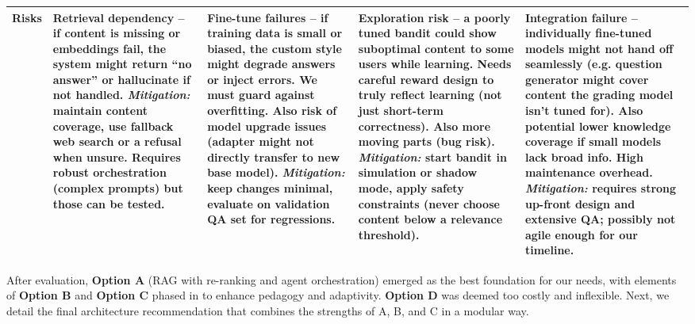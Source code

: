\documentclass[11pt]{article}
\begin{document}
\begin{table}[h!]
\begin{tabular}{p{2.8cm} p{3.4cm} p{3.4cm} p{3.4cm} p{3.4cm}}
\textbf{Risks} & Retrieval dependency – if content is missing or embeddings fail, the system might return “no answer” or hallucinate if not handled. \textit{Mitigation:} maintain content coverage, use fallback web search or a refusal when unsure. Requires robust orchestration (complex prompts) but those can be tested. & Fine-tune failures – if training data is small or biased, the custom style might degrade answers or inject errors. We must guard against overfitting. Also risk of model upgrade issues (adapter might not directly transfer to new base model). \textit{Mitigation:} keep changes minimal, evaluate on validation QA set for regressions. & Exploration risk – a poorly tuned bandit could show suboptimal content to some users while learning. Needs careful reward design to truly reflect learning (not just short-term correctness). Also more moving parts (bug risk). \textit{Mitigation:} start bandit in simulation or shadow mode, apply safety constraints (never choose content below a relevance threshold). & Integration failure – individually fine-tuned models might not hand off seamlessly (e.g. question generator might cover content the grading model isn’t tuned for). Also potential lower knowledge coverage if small models lack broad info. High maintenance overhead. \textit{Mitigation:} requires strong up-front design and extensive QA; possibly not agile enough for our timeline. \\
\bottomrule
\end{tabular}
\end{table}

After evaluation, \textbf{Option A} (RAG with re-ranking and agent orchestration) emerged as the best foundation for our needs, with elements of \textbf{Option B} and \textbf{Option C} phased in to enhance pedagogy and adaptivity. \textbf{Option D} was deemed too costly and inflexible. Next, we detail the final architecture recommendation that combines the strengths of A, B, and C in a modular way.
\end{document}
